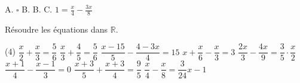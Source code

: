 \documentclass[a4paper,12pt]{report}
\begin{document}
\begin{acti}
\begin{tasks}
 
\end{tasks}
        	\begin{tasks}
A. $\square$ B.
B.
C. $1=\frac{x}{4}-\frac{3 x}{8}$
	\end{tasks}
\end{acti}
\begin{acti}
Résoudre les équations dans $\mathbb{R}$.
	\begin{tasks}(4)
\task $\dfrac{x}{2}+\dfrac{x}{3}=\dfrac{5}{6}$
\task $\dfrac{x}{3}+\dfrac{4}{5}=\dfrac{5}{6}$
\task $\dfrac{x-15}{5}-\dfrac{4-3 x}{4}=15$
\task $x+\dfrac{x}{6}-\dfrac{x}{3}=3$
\task $\dfrac{2 x}{3}-\dfrac{4 x}{9}=\dfrac{3}{5} \cdot \dfrac{x}{2}$
\task $\dfrac{x+1}{4}-\dfrac{x-1}{3}=0$
\task $\dfrac{x+3}{5}+\dfrac{x+3}{4}=\dfrac{9}{5}$
\task $\dfrac{x}{4}-\dfrac{x}{8}=\dfrac{3}{24} x-1$
	\end{tasks}
\end{acti}

\end{document}
